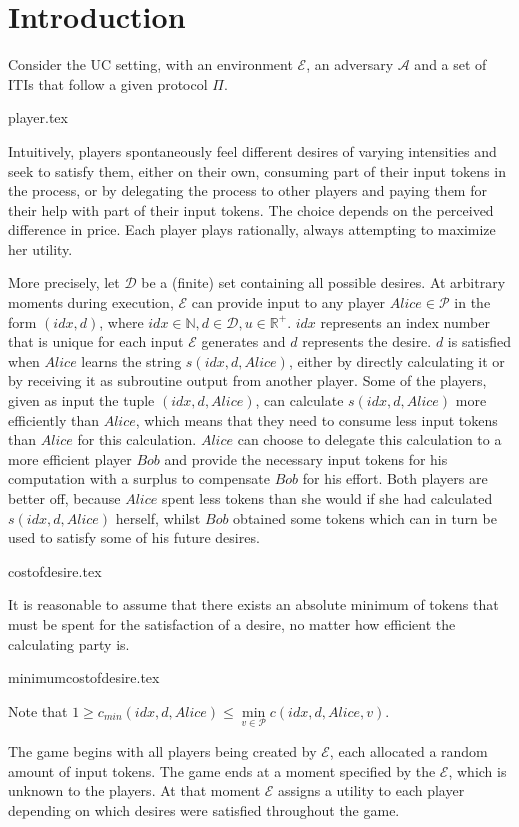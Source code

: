 \section{Introduction}
  Consider the UC setting, with an environment $\mathcal{E}$, an adversary $\mathcal{A}$ and a set of ITIs that follow a
  given protocol $\Pi$.

  {player.tex}

  Intuitively, players spontaneously feel different desires of varying intensities and seek to satisfy them, either on their
  own, consuming part of their input tokens in the process, or by delegating the process to other players and paying them for
  their help with part of their input tokens. The choice depends on the perceived difference in price. Each player plays
  rationally, always attempting to maximize her utility.
  
  More precisely, let $\mathcal{D}$ be a (finite) set containing all possible desires. At arbitrary moments during execution,
  $\mathcal{E}$ can provide input to any player $Alice \in \mathcal{P}$ in the form $\left(idx, d\right)$, where $idx \in
  \mathbb{N}, d \in \mathcal{D}, u \in \mathbb{R}^{+}$. $idx$ represents an index number that is unique for each input
  $\mathcal{E}$ generates and $d$ represents the desire. $d$ is satisfied when $Alice$ learns the string $s\left(idx, d,
  Alice\right)$, either by directly calculating it or by receiving it as subroutine output from another player. Some of the
  players, given as input the tuple $\left(idx, d, Alice\right)$, can calculate $s\left(idx, d, Alice\right)$ more efficiently
  than $Alice$, which means that they need to consume less input tokens than $Alice$ for this calculation. $Alice$ can choose
  to delegate this calculation to a more efficient player $Bob$ and provide the necessary input tokens for his computation with
  a surplus to compensate $Bob$ for his effort. Both players are better off, because $Alice$ spent less tokens than she would
  if she had calculated $s\left(idx, d, Alice\right)$ herself, whilst $Bob$ obtained some tokens which can in turn be used to
  satisfy some of his future desires.

  {costofdesire.tex}

  It is reasonable to assume that there exists an absolute minimum of tokens that must be spent for the satisfaction of a
  desire, no matter how efficient the calculating party is.

  {minimumcostofdesire.tex}

  Note that $1 \geq c_{min}\left(idx, d, Alice\right) \leq \min\limits_{v \in \mathcal{P}}{c\left(idx, d, Alice, v\right)}$.

  The game begins with all players being created by $\mathcal{E}$, each allocated a random amount of input tokens. The game
  ends at a moment specified by the $\mathcal{E}$, which is unknown to the players. At that moment $\mathcal{E}$ assigns a
  utility to each player depending on which desires were satisfied throughout the game.
